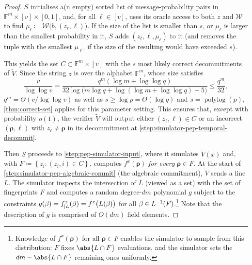 \documentclass[a4paper,UKenglish,cleveref, autoref, thm-restate]{lipics-v2021}
\theoremstyle{definition}
\newcommand{\field}{\mathbb{F}}
\renewcommand{\set}[1]{\left\{#1\right\}}
\newcommand{\polylog}{\operatorname{polylog}}
\newcommand{\vcommitlength}{v}
\newcommand{\vcommitstring}{z}
\newcommand{\pcommitlength}{p}
\newcommand{\dimension}{m}
\newcommand{\degree}{d}
\newcommand{\fieldsize}{q}
\newcommand{\fingerprinttuple}{\bm{\rho}}
\renewcommand{\line}{L}
\newcommand{\snapshot}{b}
\newcommand{\whiteboxoracle}{\mathcal{W}}
\def\fe#1{
    \ifnum#1=1
        \alpha
    \else
    \ifnum#1=2
        \beta
    \else
    \ifnum#1=3
        \gamma
    \fi\fi\fi
}
\begin{document}
\begin{proof}
    $S$ initialises a(n empty) sorted list of message-probability pairs in $\field^\dimension \times [\vcommitlength] \times [0,1]$, and, for all $\ell \in [\vcommitlength]$, uses its oracle access to both $\vcommitstring$ and $\whiteboxoracle$ to find $\mu_\ell \coloneqq \whiteboxoracle\big(\snapshot,(\vcommitstring_\ell, \ell)\big)$. If the size of the list is smaller than $s$, or $\mu_\ell$ is larger than the smallest probability in it, $S$ adds $(z_\ell, \ell, \mu_\ell)$ to it (and removes the tuple with the smallest $\mu_{\ell'}$ if the size of the resulting would have exceeded $s$). 
    
    This yields the set $C \subset \field^\dimension \times [\vcommitlength]$ with the $s$ most likely correct decommitments of $\widetilde V$. Since the string $\vcommitstring$ is over the alphabet $\field^\dimension$, whose size satisfies
    \begin{equation*}
        \frac{\vcommitlength}{\log\log \vcommitlength} = \frac{\fieldsize^\dimension (\log \dimension + \log\log \fieldsize)}{32 \log \big(\dimension \log \fieldsize + \log(\log \dimension + \log\log \fieldsize) - 5\big)} \leq \frac{\fieldsize^\dimension}{32},
    \end{equation*}
    $\fieldsize^\dimension = \Theta(\vcommitlength / \log\log \vcommitlength)$ as well as $s \geq \log \pcommitlength = \Theta(\log \fieldsize)$ and $s = \polylog(\pcommitlength)$, \cref{thm:correct-set} applies for this parameter setting. This ensures that, except with probability $o(1)$, the verifier $\widetilde V$ will output either $(z_\ell, \ell) \in C$ or an incorrect $(\fingerprinttuple, \ell)$ with $\vcommitstring_\ell \neq \fingerprinttuple$ in its decommitment at \cref{step:simulator-pep-temporal-decommit}. 
    
    Then $S$ proceeds to \cref{step:pep-simulator-input}, where it simulates $\widetilde V(x)$ and, with $F \coloneqq \set{\vcommitstring_i : (\vcommitstring_i, i) \in C}$, computes $f^x(\fingerprinttuple)$ \emph{for every} $\fingerprinttuple \in F$.
    At the start of \cref{step:simulator-pep-algebraic-commit} (the algebraic commitment), $\widetilde V$ sends a line $\line$. The simulator inspects the intersection of $L$ (viewed as a set) with the set of fingerprints $F$ and computes a random degree-$\degree\dimension$ polynomial $g$ subject to the constraints $g(\fe2) = f^x_{|\line}(\fe2) = f^x\big(\line(\fe2)\big)$ for all $\fe2 \in \line^{-1}(F)$.\footnote{Knowledge of $f^x(\fingerprinttuple)$ for all $\fingerprinttuple \in F$ enables the simulator to sample from this distribution: $F$ fixes $\abs{\line \cap F}$ evaluations, and the simulator sets the $\degree\dimension - \abs{\line \cap F}$ remaining ones uniformly.} Note that the description of $g$ is comprised of $O(\degree\dimension)$ field elements.
    

\end{proof}
\end{document}
